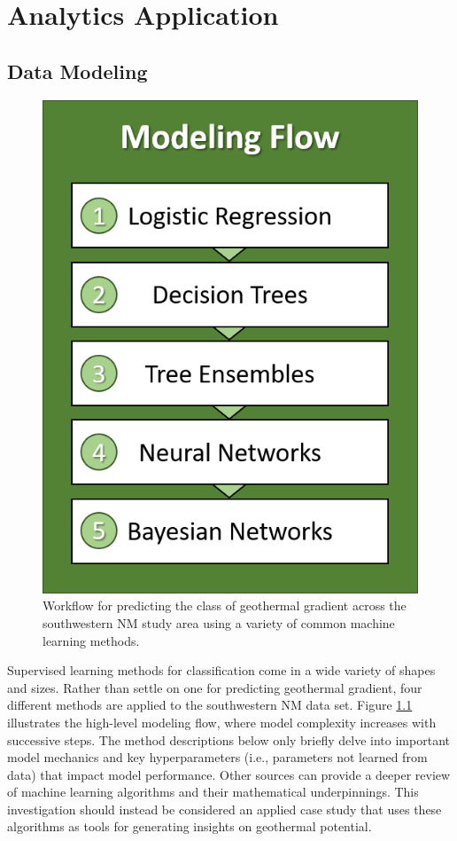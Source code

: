 \chapter{Analytics Application}\label{ch5:expl_applied}

\section{Data Modeling}

\begin{figure}
\centering
\includegraphics[scale=.6]{templates/images/Flow-Modeling.png}
\singlespacing
\caption[Modeling workflow]{Workflow for predicting the class of geothermal gradient across the southwestern NM study area using a variety of common machine learning methods.}
\label{fig:model_flow}
\end{figure}

Supervised learning methods for classification come in a wide variety of shapes and sizes. Rather than settle on one for predicting geothermal gradient, four different methods are applied to the southwestern NM data set. Figure \ref{fig:model_flow} illustrates the high-level modeling flow, where model complexity increases with successive steps. The method descriptions below only briefly delve into important model mechanics and key hyperparameters (i.e., parameters not learned from data) that impact model performance. Other sources can provide a deeper review of machine learning algorithms and their mathematical underpinnings. This investigation should instead be considered an applied case study that uses these algorithms as tools for generating insights on geothermal potential. 

